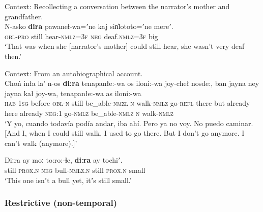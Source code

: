 \begin{exe}
	\ex\label{exAppendixMovima1}
	Context: Recollecting a conversation between the narrator's mother and grandfather. \\
	\gll N-asko \textbf{dira} pawaneɬ-wa=ʼne kaj sin̍lototo=ʼne mereʼ.\\
\textsc{obl}-\textsc{pro} still hear-\textsc{nmlz}=3\textsc{f} \textsc{neg} deaf.\textsc{nmlz}=3\textsc{f} big\\
	\glt \lq That was when she [narrator's mother] could still hear, she wasn't very deaf then.\rq{ }\parencite{MovimaCorpus}

	\ex\label{exAppendixMovima2} Context: From an autobiographical account.\\
	\gll Choń inła la' n-os \textbf{di:ra} tenapanłe:-wa os iloni:-wa joy-cheł nosde:, ban jayna ney jayna kał joy-wa, tenapanłe:-wa as iloni:-wa\\
\textsc{hab} 1\textsc{sg} before \textsc{obl}-\textsc{n} still be\_able-\textsc{nmzl} \textsc{n} walk-\textsc{nmlz} go-\textsc{refl} there but already here already \textsc{neg}:1 go-\textsc{nmlz} be\_able-\textsc{nmlz} \textsc{n} walk-\textsc{nmlz}\\
	\glt \lq Y yo, cuando todavía podía andar, iba ahí. Pero ya no voy. No puedo caminar. [And I, when I could still walk, I used to go there. But I don't go anymore. I can't walk (anymore).]\rq{ }\parencite{MovimaCorpus}
	
	\ex\label{exAppendixMovima3}
	\gll Diːra ay moː to:ro:-ɬe, \textbf{diːra} ay tochiʼ.\\
still \textsc{prox}.\textsc{n} \textsc{neg} bull-\textsc{nmlz}.\textsc{n} still \textsc{prox}.\textsc{n} small\\
	\glt \lq This one isnʼt a bull yet, itʼs still small.' \parencite[473]{Haude2006}
\end{exe}

\subsubsection{Restrictive (non-temporal)}
